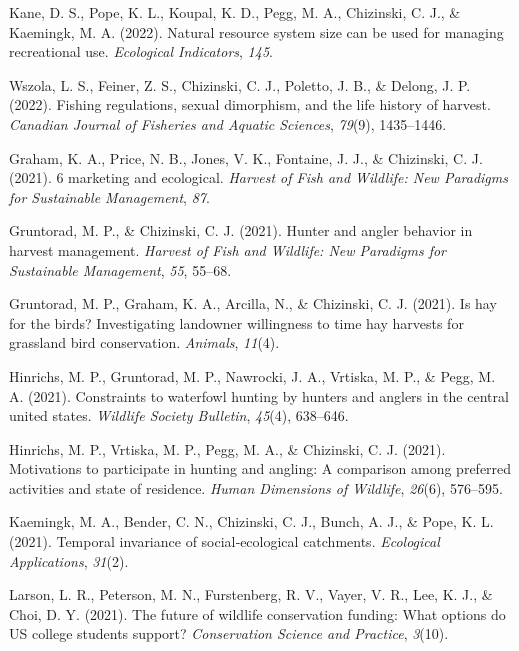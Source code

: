 \documentclass[
  12pt,
]
{article}
\newlength{\cslhangindent}
\newlength{\cslentryspacingunit} %
\newenvironment{CSLReferences}[2] %
 {%
  \setlength{\parindent}{0pt}
  \ifodd #1
  \let\oldpar\par
  \def\par{\hangindent=\cslhangindent\oldpar}
  \fi
  \setlength{\parskip}{#2\cslentryspacingunit}
 }%
 {}
\begin{document}
\begin{CSLReferences}{1}{0}
\leavevmode{}%
Kane, D. S., Pope, K. L., Koupal, K. D., Pegg, M. A., Chizinski, C. J.,
\& Kaemingk, M. A. (2022). Natural resource system size can be used for
managing recreational use. \emph{Ecological Indicators}, \emph{145}.

\leavevmode{}%
Wszola, L. S., Feiner, Z. S., Chizinski, C. J., Poletto, J. B., \&
Delong, J. P. (2022). Fishing regulations, sexual dimorphism, and the
life history of harvest. \emph{Canadian Journal of Fisheries and Aquatic
Sciences}, \emph{79}(9), 1435--1446.

\leavevmode{}%
Graham, K. A., Price, N. B., Jones, V. K., Fontaine, J. J., \&
Chizinski, C. J. (2021). 6 marketing and ecological. \emph{Harvest of
Fish and Wildlife: New Paradigms for Sustainable Management}, \emph{87}.

\leavevmode{}%
Gruntorad, M. P., \& Chizinski, C. J. (2021). Hunter and angler behavior
in harvest management. \emph{Harvest of Fish and Wildlife: New Paradigms
for Sustainable Management}, \emph{55}, 55--68.

\leavevmode{}%
Gruntorad, M. P., Graham, K. A., Arcilla, N., \& Chizinski, C. J.
(2021). Is hay for the birds? Investigating landowner willingness to
time hay harvests for grassland bird conservation. \emph{Animals},
\emph{11}(4).

\leavevmode{}%
Hinrichs, M. P., Gruntorad, M. P., Nawrocki, J. A., Vrtiska, M. P., \&
Pegg, M. A. (2021). Constraints to waterfowl hunting by hunters and
anglers in the central united states. \emph{Wildlife Society Bulletin},
\emph{45}(4), 638--646.

\leavevmode{}%
Hinrichs, M. P., Vrtiska, M. P., Pegg, M. A., \& Chizinski, C. J.
(2021). Motivations to participate in hunting and angling: A comparison
among preferred activities and state of residence. \emph{Human
Dimensions of Wildlife}, \emph{26}(6), 576--595.

\leavevmode{}%
Kaemingk, M. A., Bender, C. N., Chizinski, C. J., Bunch, A. J., \& Pope,
K. L. (2021). Temporal invariance of social‐ecological catchments.
\emph{Ecological Applications}, \emph{31}(2).

\leavevmode{}%
Larson, L. R., Peterson, M. N., Furstenberg, R. V., Vayer, V. R., Lee,
K. J., \& Choi, D. Y. (2021). The future of wildlife conservation
funding: What options do US college students support? \emph{Conservation
Science and Practice}, \emph{3}(10).


\end{CSLReferences}
\end{document}
